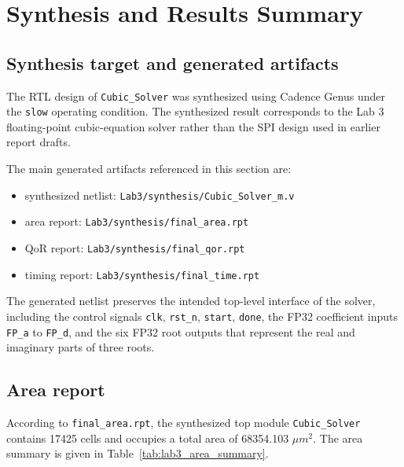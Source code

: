 \section{Synthesis and Results Summary}

\subsection{Synthesis target and generated artifacts}

The RTL design of \texttt{Cubic\_Solver} was synthesized using Cadence Genus under the \texttt{slow} operating condition. The synthesized result corresponds to the Lab 3 floating-point cubic-equation solver rather than the SPI design used in earlier report drafts.

The main generated artifacts referenced in this section are:
\begin{itemize}
    \item synthesized netlist: \texttt{Lab3/synthesis/Cubic\_Solver\_m.v}
    \item area report: \texttt{Lab3/synthesis/final\_area.rpt}
    \item QoR report: \texttt{Lab3/synthesis/final\_qor.rpt}
    \item timing report: \texttt{Lab3/synthesis/final\_time.rpt}
\end{itemize}

The generated netlist preserves the intended top-level interface of the solver, including the control signals \texttt{clk}, \texttt{rst\_n}, \texttt{start}, \texttt{done}, the FP32 coefficient inputs \texttt{FP\_a} to \texttt{FP\_d}, and the six FP32 root outputs that represent the real and imaginary parts of three roots.

\subsection{Area report}

According to \texttt{final\_area.rpt}, the synthesized top module \texttt{Cubic\_Solver} contains 17425 cells and occupies a total area of 68354.103 $\mu m^2$. The area summary is given in Table~\ref{tab:lab3_area_summary}.

